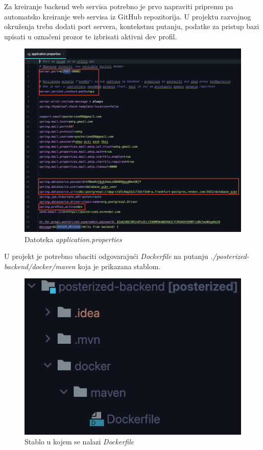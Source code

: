 			\pagebreak
			 Za kreiranje backend web servisa potrebno je prvo napraviti pripremu pa automatsko kreiranje web servisa iz GitHub repozitorija. U projektu razvojnog okruženja treba dodati port servera, kontekstnu putanju, podatke za pristup bazi upisati u označeni prozor te izbrisati aktivni dev profil.
			\begin{figure}[H]
				\includegraphics[scale=0.4]{slike/deploy/backend8.png} %
				\centering
				\caption{Datoteka \textit{application.properties}}
				\label{fig:promjene}
			\end{figure}
			U projekt je potrebno ubaciti odgovarajući \textit{Dockerfile} na putanju \textit{./posterized-backend/docker/maven} koja je prikazana stablom.
			\begin{figure}[H]
				\includegraphics[scale=0.8]{slike/deploy/backend7.png} %
				\centering
				\caption{Stablo u kojem se nalazi \textit{Dockerfile}}
				\label{fig:promjene}
			\end{figure}
			
